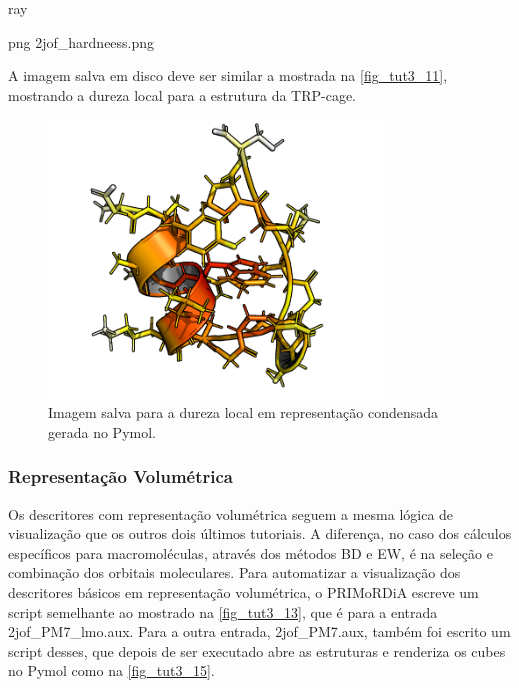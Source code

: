 \documentclass[a4paper,11pt]{refart}
\begin{document}
\hspace*{-\leftmarginwidth}
\begin{minipage}{\fullwidth}
	\begin{pymol}ray\end{pymol}
\end{minipage}

\hspace*{-\leftmarginwidth}
\begin{minipage}{\fullwidth}
	\begin{pymol}png 2jof_hardneess.png\end{pymol}
\end{minipage}

A imagem salva em disco deve ser similar a mostrada na \autoref{fig_tut3_11}, mostrando a dureza local para a estrutura da TRP-cage.  

\hspace*{-\leftmarginwidth}
\begin{minipage}{\fullwidth}
	\begin{figure}[H]
		\begin{center}
			\includegraphics[width=3.5in]{images/tut3_img13}
			\caption{Imagem salva para a dureza local em representação condensada gerada no Pymol.}
			\label{fig_tut3_11}
		\end{center}
	\end{figure}
\end{minipage}


\subsubsection{Representação Volumétrica}


Os descritores com representação volumétrica seguem a mesma lógica de visualização que os outros dois últimos tutoriais. A diferença, no caso dos cálculos específicos para macromoléculas, através dos métodos BD e EW, é na seleção e combinação dos orbitais moleculares. Para automatizar a visualização dos descritores básicos em representação volumétrica, o PRIMoRDiA escreve um script semelhante ao mostrado na \autoref{fig_tut3_13}, que é para a entrada 2jof\_PM7\_lmo.aux. Para a outra entrada, 2jof\_PM7.aux, também foi escrito um script desses, que depois de ser executado abre as estruturas e renderiza os cubes no Pymol como na \autoref{fig_tut3_15}.
\end{document}
